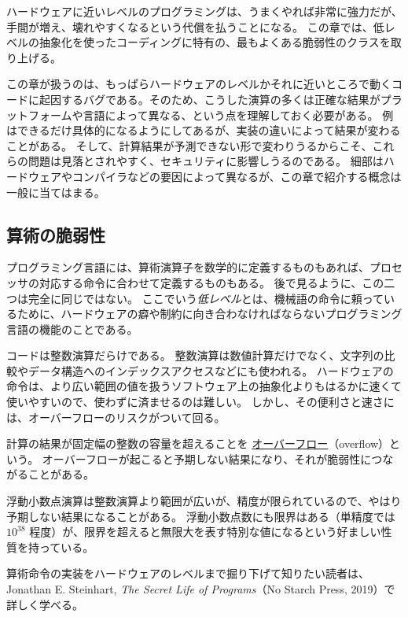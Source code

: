 \documentclass[uplatex]{jsarticle}
\def\label#1{}%
\newcounter{thm}[section]
\begin{document}
ハードウェアに近いレベルのプログラミングは、うまくやれば非常に強力だが、手間が増え、壊れやすくなるという代償を払うことになる。
この章では、低レベルの抽象化を使ったコーディングに特有の、最もよくある脆弱性のクラスを取り上げる。

この章が扱うのは、もっぱらハードウェアのレベルかそれに近いところで動くコードに起因するバグである。そのため、こうした演算の多くは正確な結果がプラットフォームや言語によって異なる、という点を理解しておく必要がある。
例はできるだけ具体的になるようにしてあるが、実装の違いによって結果が変わることがある。
そして、計算結果が予測できない形で変わりうるからこそ、これらの問題は見落とされやすく、セキュリティに影響しうるのである。
細部はハードウェアやコンパイラなどの要因によって異なるが、この章で紹介する概念は一般に当てはまる。

\subsection{算術の脆弱性}

プログラミング言語には、算術演算子を数学的に定義するものもあれば、プロセッサの対応する命令に合わせて定義するものもある。
後で見るように、この二つは完全に同じではない。
ここでいう\emph{低レベル}とは、機械語の命令に頼っているために、ハードウェアの癖や制約に向き合わなければならないプログラミング言語の機能のことである。

コードは整数演算だらけである。
整数演算は数値計算だけでなく、文字列の比較やデータ構造へのインデックスアクセスなどにも使われる。
ハードウェアの命令は、より広い範囲の値を扱うソフトウェア上の抽象化よりもはるかに速くて使いやすいので、使わずに済ませるのは難しい。
しかし、その便利さと速さには、オーバーフローのリスクがついて回る。

\begin{dfn}[オーバーフロー]\label{dfn:ch9-overflow}
計算の結果が固定幅の整数の容量を超えることを \underline{オーバーフロー}（overflow）という。
オーバーフローが起こると予期しない結果になり、それが脆弱性につながることがある。
\end{dfn}

浮動小数点演算は整数演算より範囲が広いが、精度が限られているので、やはり予期しない結果になることがある。
浮動小数点数にも限界はある（単精度では $10^{38}$ 程度）が、限界を超えると無限大を表す特別な値になるという好ましい性質を持っている。

算術命令の実装をハードウェアのレベルまで掘り下げて知りたい読者は、Jonathan E. Steinhart, \textit{The Secret Life of Programs}（No Starch Press, 2019）で詳しく学べる。
\end{document}
